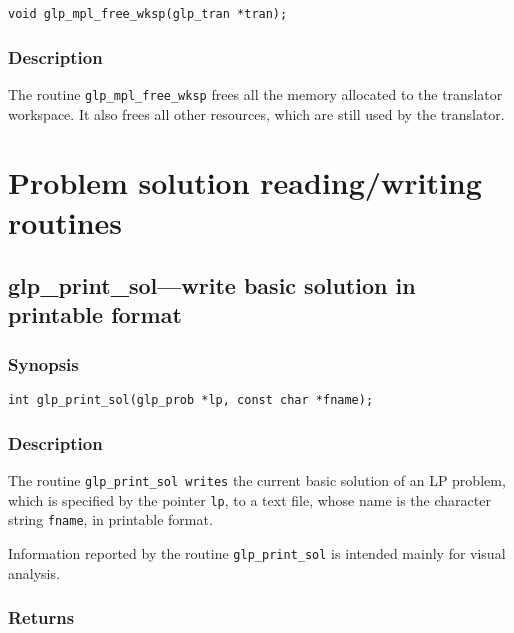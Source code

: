 \begin{verbatim}
void glp_mpl_free_wksp(glp_tran *tran);
\end{verbatim}

\subsubsection*{Description}

The routine \verb|glp_mpl_free_wksp| frees all the memory allocated to
the translator workspace. It also frees all other resources, which are
still used by the translator.


\newpage

\section{Problem solution reading/writing routines}

\subsection{glp\_print\_sol---write basic solution in printable format}

\subsubsection*{Synopsis}

\begin{verbatim}
int glp_print_sol(glp_prob *lp, const char *fname);
\end{verbatim}

\subsubsection*{Description}

The routine \verb|glp_print_sol writes| the current basic solution of
an LP problem, which is specified by the pointer \verb|lp|, to a text
file, whose name is the character string \verb|fname|, in printable
format.

Information reported by the routine \verb|glp_print_sol| is intended
mainly for visual analysis.

\subsubsection*{Returns}

